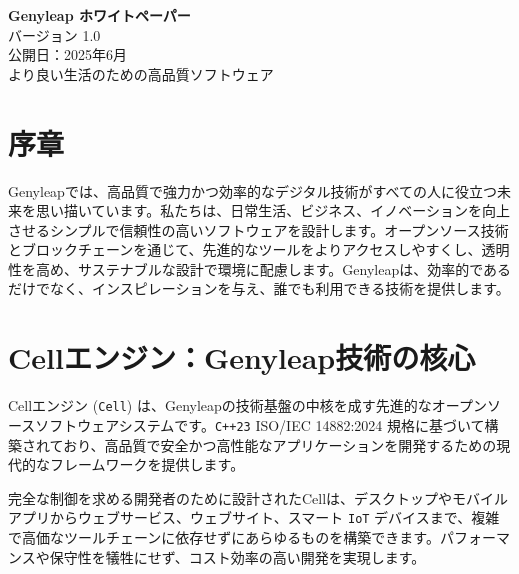 \documentclass[a4paper,12pt,openany]{book}
\begin{document}
\begin{titlepage}
    \begin{center}
        \vspace*{1.5cm}
        {\Huge \textbf{Genyleap ホワイトペーパー}} \\
        \vspace{0.5cm}
        {\Large バージョン 1.0} \\
        \vspace{0.5cm}
        {\large 公開日：2025年6月} \\
        \vspace{1.5cm}
        {\large より良い生活のための高品質ソフトウェア} \\
    \end{center}
    \vfill
\end{titlepage}

\chapter{序章}
Genyleapでは、高品質で強力かつ効率的なデジタル技術がすべての人に役立つ未来を思い描いています。私たちは、日常生活、ビジネス、イノベーションを向上させるシンプルで信頼性の高いソフトウェアを設計します。オープンソース技術とブロックチェーンを通じて、先進的なツールをよりアクセスしやすくし、透明性を高め、サステナブルな設計で環境に配慮します。Genyleapは、効率的であるだけでなく、インスピレーションを与え、誰でも利用できる技術を提供します。

\chapter{Cellエンジン：Genyleap技術の核心}

Cellエンジン (\texttt{Cell}) は、Genyleapの技術基盤の中核を成す先進的なオープンソースソフトウェアシステムです。\texttt{C++23} ISO/IEC 14882:2024 規格に基づいて構築されており、高品質で安全かつ高性能なアプリケーションを開発するための現代的なフレームワークを提供します。

完全な制御を求める開発者のために設計されたCellは、デスクトップやモバイルアプリからウェブサービス、ウェブサイト、スマート \texttt{IoT} デバイスまで、複雑で高価なツールチェーンに依存せずにあらゆるものを構築できます。パフォーマンスや保守性を犠牲にせず、コスト効率の高い開発を実現します。
\end{document}

